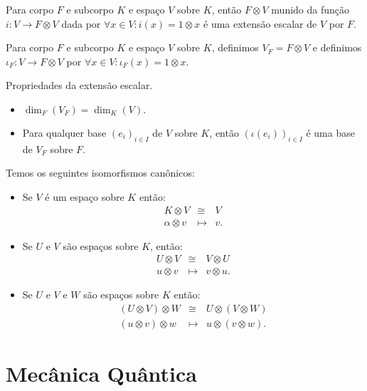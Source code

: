 \documentclass[11pt,twoside,a4paper]{book}
\begin{document}
\begin{proposicao}
Para corpo $F$ e subcorpo $K$ e espaço $V$ sobre $K$, então $F\otimes V$ munido da função $i:V\rightarrow F\otimes V$ dada por $\forall x\in V:i(x)=1\otimes x$ é uma extensão escalar de $V$ por $F.$
\end{proposicao}

\begin{definicao}
Para corpo $F$ e subcorpo $K$ e espaço $V$ sobre $K$, definimos $V_F=F\otimes V$ e definimos $\iota_F:V\rightarrow F\otimes V$ por $\forall x\in V:\iota_F(x)=1\otimes x.$
\end{definicao}

\begin{proposicao}
Propriedades da extensão escalar.
\begin{itemize}
\item $\dim_F(V_F)=\dim_K(V).$
\item Para qualquer base $(e_i)_{i\in I}$ de $V$ sobre $K$, então $(\iota(e_i))_{i\in I}$ é uma base de $V_F$ sobre $F.$
\end{itemize}
\end{proposicao}

\begin{proposicao}
Temos os seguintes isomorfismos canônicos:
\begin{itemize}
\item Se $V$ é um espaço sobre $K$ então:
\[
\begin{array}{rcl}
K\otimes V&\cong&V\\
\alpha\otimes v&\mapsto&v.
\end{array}
\]
\item Se $U$ e $V$ são espaços sobre $K$, então:
\[
\begin{array}{rcl}
U\otimes V&\cong&V\otimes U\\
u\otimes v&\mapsto&v\otimes u.
\end{array}
\]
\item Se $U$ e $V$ e $W$ são espaços sobre $K$ então:
\[
\begin{array}{rcl}
(U\otimes V)\otimes W&\cong&U\otimes(V\otimes W)\\
(u\otimes v)\otimes w&\mapsto&u\otimes(v\otimes w).
\end{array}
\]
\end{itemize}
\end{proposicao}

\chapter{Mecânica Quântica}
\end{document}
